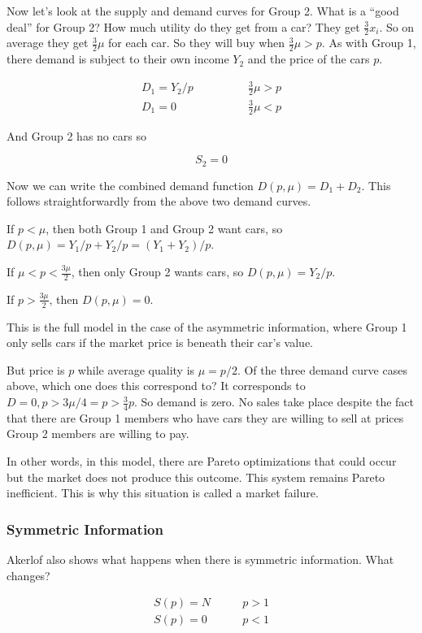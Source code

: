 \documentclass[11pt]{article}
\begin{document}
Now let's look at the supply and demand curves for Group 2. What is a ``good deal'' for Group 2? How much utility do they get from a car? They get $\frac{3}{2}x_i$. So on average they get $\frac{3}{2}\mu$ for each car. So they will buy when $\frac{3}{2}\mu > p$.
As with Group 1, there demand is subject to their own income $Y_2$ and the price of the cars $p$. 

\begin{align*}
D_1 = Y_2/p & \qquad \qquad \frac{3}{2}\mu > p \\
D_1 = 0 & \qquad \qquad \frac{3}{2}\mu < p
\end{align*}

And Group 2 has no cars so 

$$S_2 = 0$$

Now we can write the combined demand function $D(p, \mu) = D_1 + D_2$. This follows straightforwardly from the above two demand curves. 

If $p<\mu$, then both Group 1 and Group 2 want cars, so $D(p, \mu) = Y_1/p + Y_2/p = (Y_1 + Y_2)/p$.

If $\mu < p < \frac{3\mu}{2}$, then only Group 2 wants cars, so $D(p, \mu) = Y_2/p$.

If $ p > \frac{3\mu}{2}$, then $D(p, \mu) = 0$. 

This is the full model in the case of the asymmetric information, where Group 1 only sells cars if the market price is beneath their car's value. 

But price is $p$ while average quality is $\mu = p/2$. Of the three demand curve cases above, which one does this correspond to? It corresponds to $D = 0, p>3\mu/4 = p > \frac{3}{4}p$. So demand is zero. No sales take place despite the fact that there are Group 1 members who have cars they are willing to sell at prices Group 2 members are willing to pay.

In other words, in this model, there are Pareto optimizations that could occur but the market does not produce this outcome. This system remains Pareto inefficient. This is why this situation is called a market failure.

\subsubsection{Symmetric Information}

Akerlof also shows what happens when there is symmetric information. What changes? 

\begin{align*}
    S(p) = N & \qquad p > 1\\
    S(p) = 0 & \qquad p < 1
\end{align*}
\end{document}
